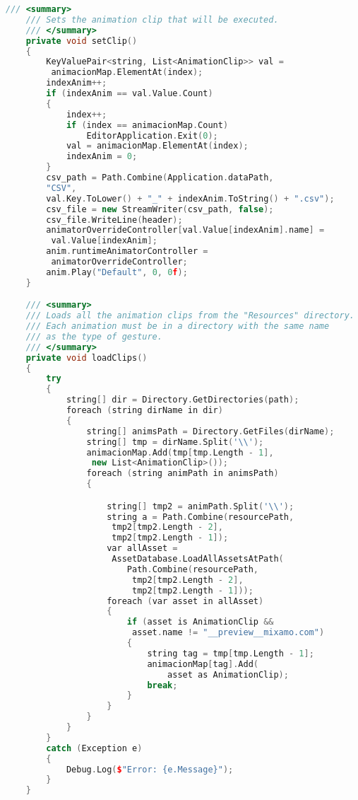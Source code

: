 \begin{lstlisting}[language=C++]
    /// <summary>
    /// Sets the animation clip that will be executed.
    /// </summary>
    private void setClip()
    {
        KeyValuePair<string, List<AnimationClip>> val = 
         animacionMap.ElementAt(index);
        indexAnim++;
        if (indexAnim == val.Value.Count)
        {
            index++;
            if (index == animacionMap.Count)
                EditorApplication.Exit(0);
            val = animacionMap.ElementAt(index);
            indexAnim = 0;
        }
        csv_path = Path.Combine(Application.dataPath, 
        "CSV", 
        val.Key.ToLower() + "_" + indexAnim.ToString() + ".csv");
        csv_file = new StreamWriter(csv_path, false);
        csv_file.WriteLine(header);
        animatorOverrideController[val.Value[indexAnim].name] = 
         val.Value[indexAnim];
        anim.runtimeAnimatorController = 
         animatorOverrideController;
        anim.Play("Default", 0, 0f);
    }

    /// <summary>
    /// Loads all the animation clips from the "Resources" directory.
    /// Each animation must be in a directory with the same name 
    /// as the type of gesture.
    /// </summary>
    private void loadClips()
    {
        try
        {
            string[] dir = Directory.GetDirectories(path);
            foreach (string dirName in dir)
            {
                string[] animsPath = Directory.GetFiles(dirName);
                string[] tmp = dirName.Split('\\');
                animacionMap.Add(tmp[tmp.Length - 1], 
                 new List<AnimationClip>());
                foreach (string animPath in animsPath)
                {

                    string[] tmp2 = animPath.Split('\\');
                    string a = Path.Combine(resourcePath, 
                     tmp2[tmp2.Length - 2], 
                     tmp2[tmp2.Length - 1]);
                    var allAsset = 
                     AssetDatabase.LoadAllAssetsAtPath(
                        Path.Combine(resourcePath, 
                         tmp2[tmp2.Length - 2], 
                         tmp2[tmp2.Length - 1]));
                    foreach (var asset in allAsset)
                    {
                        if (asset is AnimationClip && 
                         asset.name != "__preview__mixamo.com")
                        {
                            string tag = tmp[tmp.Length - 1];
                            animacionMap[tag].Add(
                                asset as AnimationClip);
                            break;
                        }
                    }
                }
            }
        }
        catch (Exception e)
        {
            Debug.Log($"Error: {e.Message}");
        }
    }


\end{lstlisting}
